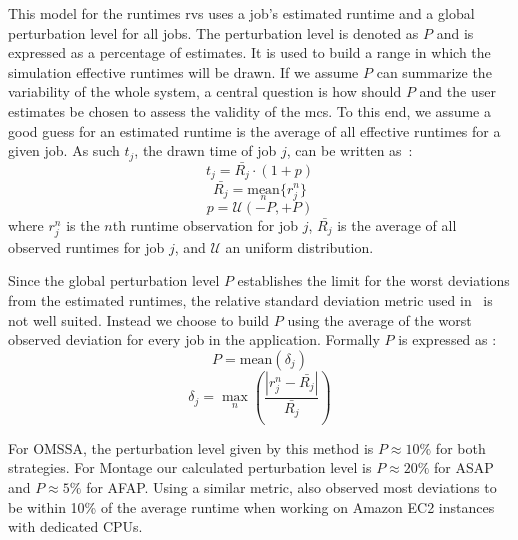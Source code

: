 \documentclass[10pt,conference,compsocconf]{IEEEtran}
\begin{document}
This model for the runtimes \acp{rv} uses a job's estimated runtime and a global
perturbation  level  for  all  jobs.  The perturbation  level is denoted as $P$
and is expressed  as  a percentage of estimates. It is used  to build a range in which the simulation
effective runtimes will be drawn. If we assume $P$ can summarize the variability
of the whole system, a central question is how should $P$ and the user estimates
be chosen to assess the validity of the \ac{mcs}.  To this end, we assume a good
guess for an  estimated runtime is the  average of all effective  runtimes for a
given job. As such $t_j$, the drawn time of job $j$, can be written as~:
\begin{equation}
	t_j = \bar{R_j} \cdot (1 + p)
	\label{eq:t}
\end{equation}
\begin{equation}
	\bar{R_j} = \underset{n}{\textrm{mean}}\{r_j^n\}
\end{equation}
\begin{equation}
	p = \mathcal{U}(-P,+P)
	\label{eq:r}
\end{equation}
where $r_j^n$ is the $n$th runtime observation for job $j$, $\bar{R_j}$ is the
average of all observed runtimes for job $j$, and $\mathcal{U}$ an uniform distribution.

Since the global perturbation level $P$ establishes the limit for the worst
deviations from the estimated runtimes, the relative standard deviation metric
used in~\cite{LeitnerC16} is not well suited. Instead we choose to build $P$
using the average of the worst observed deviation for every job in the
application. Formally $P$ is expressed as :
\begin{equation}
P = \textrm{mean}(\delta{}_j)
\label{eq:P}
\end{equation}
\begin{equation}
\delta{}_j =
\max_n\left(\frac{|r_j^n-\bar{R_j}|}{\bar{R_j}}\right)
\label{eq:d}
\end{equation}

For OMSSA, the perturbation level given by this method is $P\approx{}10\%$ for both
strategies. For Montage  our calculated perturbation level is  $P\approx{}20\%$
for ASAP and $P\approx{}5\%$ for AFAP. Using a similar metric, \cite{pics} also 
observed most deviations to be within 10\% of the average runtime when working on
Amazon EC2 instances with dedicated CPUs.
\end{document}

